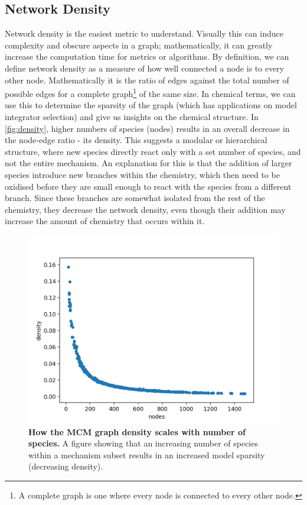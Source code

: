 \subsection{Network Density}\label{sec:netdensity}
Network density is the easiest metric to understand. Visually this can induce complexity and obscure aspects in a graph; mathematically, it can greatly increase the computation time for metrics or algorithms. By definition, we can define network density as a measure of how well connected a node is to every other node. Mathematically it is the ratio of edges against the total number of possible edges for a complete graph\footnote{A complete graph is one where every node is connected to every other node.} of the same size. In chemical terms, we can use this to determine the sparsity of the graph (which has applications on model integrator selection) and give us insights on the chemical structure.  In \autoref{fig:density}, higher numbers of species (nodes) results in an overall decrease in the node-edge ratio - its density. This suggests a modular or hierarchical structure, where new species directly react only with a set number of species, and not the entire mechanism. An explanation for this is that the addition of larger species introduce new branches within the chemistry, which then need to be oxidised before they are small enough to react with the species from a different branch.  Since these branches are somewhat isolated from the rest of the chemistry, they decrease the network density, even though their addition may increase the amount of chemistry that occurs within it.

\begin{figure}[H]
     \centering
         \includegraphics[width=.7\textwidth]{figures_c3/sparcity.png}
        \caption{\textbf{How the MCM graph density scales with number of species.} A figure showing that an increasing number of species within a mechanism subset results in an increased model sparsity (decreasing density).}
        \label{fig:density}
\end{figure}



